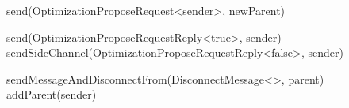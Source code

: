 \begin{algorithm}
\begin{algorithmic}[1]
                \State send(OptimizationProposeRequest<sender>, newParent)
            \EndIf
        \asdend

             
                \State send(OptimizationProposeRequestReply<true>, sender)
            \Else
                \State sendSideChannel(OptimizationProposeRequestReply<false>, sender)
            \EndIf
        \asdend

                \State sendMessageAndDisconnectFrom(DisconnectMessage<>, parent)
                \State addParent(sender)
            \EndIf
        \asdend

    \end{algorithmic}
\end{algorithm}